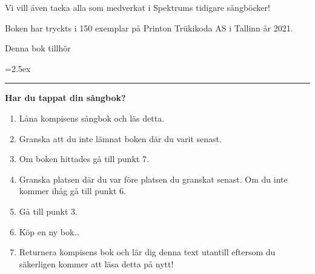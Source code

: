 \begin{footnotesize}
\begin{minipage}{\textwidth}
	    \vspace{.2cm}
	    
	    Vi vill även tacka alla som medverkat i Spektrums tidigare sångböcker!
		
		Boken har tryckts i 150 exemplar på Printon Trükikoda AS i Tallinn år 2021.
	
	\end{minipage}
		
\end{footnotesize}

\newpage

\thispagestyle{empty}

\null
\vfill
\begin{center}
\end{center}

\newpage

\thispagestyle{empty}


\mbox{}

\vspace{2.3cm}\hspace{15.5mm}%
\begin{minipage}[t]{.7\textwidth}
    \ECFAugie
	\begin{center}
	    \hspace{1.5ex}\Huge Denna bok tillhör
	\end{center}
	

	\normalsize	
	
	\vspace{5ex}
	\parindent=2.5ex
	\rule{75mm}{0.4ex}
	
	\vspace{1.5ex}
	\textbf{Har du tappat din sångbok?}
	\vspace{1ex}
	\begin{enumerate}
		\parskip=0.5ex
		\item Låna kompisens sångbok och läs detta.
		\item Granska att du inte lämnat boken där du varit senast.
		\item Om boken hittades gå till punkt 7.
		\item Granska platsen där du var före platsen du granskat senast. Om du inte kommer ihåg gå till punkt 6.
		\item Gå till punkt 3.
		\item Köp en ny bok\ldots{}
		\item Returnera kompisens bok och lär dig denna text utantill eftersom du säkerligen kommer att läsa detta på nytt!
	\end{enumerate}
\end{minipage}

